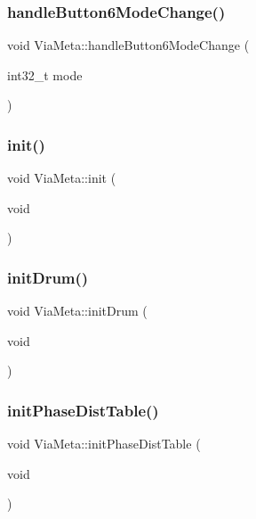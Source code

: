 \mbox{\label{class_via_meta_a0024df4fef40405972532536f4cc0226}} 
\subsubsection{\texorpdfstring{handle\+Button6\+Mode\+Change()}{handleButton6ModeChange()}}
{\footnotesize\ttfamily void Via\+Meta\+::handle\+Button6\+Mode\+Change (\begin{DoxyParamCaption}\item[{int32\+\_\+t}]{mode }\end{DoxyParamCaption})}

\mbox{\label{class_via_meta_ae4754bc3d05ef786e88b8925654b10e7}} 
\subsubsection{\texorpdfstring{init()}{init()}}
{\footnotesize\ttfamily void Via\+Meta\+::init (\begin{DoxyParamCaption}\item[{void}]{ }\end{DoxyParamCaption})}

\mbox{\label{class_via_meta_a180d1594d18fb1eb200aa9f3563f581c}} 
\subsubsection{\texorpdfstring{init\+Drum()}{initDrum()}}
{\footnotesize\ttfamily void Via\+Meta\+::init\+Drum (\begin{DoxyParamCaption}\item[{void}]{ }\end{DoxyParamCaption})}

\mbox{\label{class_via_meta_a8437126f7bb29c15b4dc5953a91e536f}} 
\subsubsection{\texorpdfstring{init\+Phase\+Dist\+Table()}{initPhaseDistTable()}}
{\footnotesize\ttfamily void Via\+Meta\+::init\+Phase\+Dist\+Table (\begin{DoxyParamCaption}\item[{void}]{ }\end{DoxyParamCaption})}

